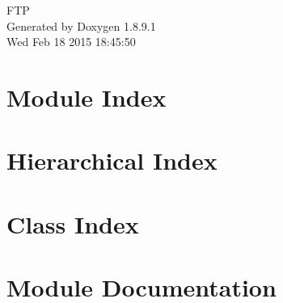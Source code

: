 \documentclass[twoside]{book}
\newcommand{\+}{\discretionary{\mbox{\scriptsize$\hookleftarrow$}}{}{}}
\newcommand{\clearemptydoublepage}{%
  \newpage{\pagestyle{empty}\cleardoublepage}%
}
\begin{document}
\hypersetup{pageanchor=false,
             bookmarks=true,
             bookmarksnumbered=true,
             pdfencoding=unicode
            }
\begin{titlepage}
\vspace*{7cm}
\begin{center}%
{\Large F\+T\+P }\\
\vspace*{1cm}
{\large Generated by Doxygen 1.8.9.1}\\
\vspace*{0.5cm}
{\small Wed Feb 18 2015 18:45:50}\\
\end{center}
\end{titlepage}
\clearemptydoublepage
\tableofcontents
\clearemptydoublepage
{}
\hypersetup{pageanchor=true}

\chapter{Module Index}

\chapter{Hierarchical Index}

\chapter{Class Index}

\chapter{Module Documentation}





\end{document}
